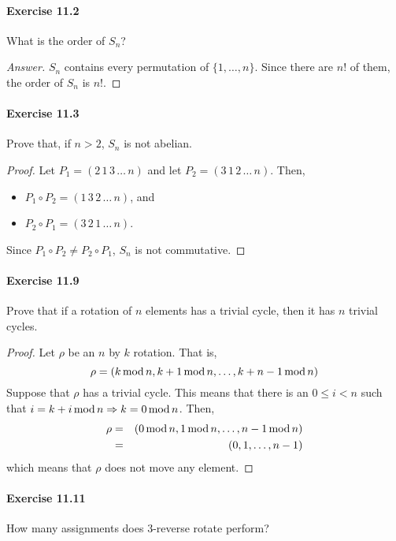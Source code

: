 \paragraph{Exercise 11.2}
What is the order of $S_n$?

\begin{proof}[Answer]
$S_n$ contains every permutation of $\{1,\dots,n\}$. Since there are $n!$ of
them, the order of $S_n$ is $n!$.
\end{proof}

\paragraph{Exercise 11.3}
Prove that, if $n > 2$, $S_n$ is not abelian.

\begin{proof}
Let $P_1 = (2 \, 1 \, 3 \, \dots \, n)$ and let
$P_2 = (3 \, 1 \, 2 \, \dots \, n)$. Then,
\begin{itemize}
    \item $P_1 \circ P_2 = (1 \, 3 \, 2 \, \dots \, n)$, and
    \item $P_2 \circ P_1 = (3 \, 2 \, 1 \, \dots \, n)$.
\end{itemize}
Since $P_1 \circ P_2 \neq P_2 \circ P_1$, $S_n$ is not commutative.
\end{proof}


\paragraph{Exercise 11.9}
Prove that if a rotation of $n$ elements has a trivial cycle, then it has $n$
trivial cycles.

\begin{proof}
Let $\rho$ be an $n$ by $k$ rotation. That is,
$$\rho = (k \, \mathrm{mod} \, n, k+1 \, \mathrm{mod} \, n, \dots, k+n-1 \, \mathrm{mod} \, n)$$
Suppose that $\rho$ has a trivial cycle. This means that there is an
$0 \leq i < n$ such that $i = k + i \, \mathrm{mod} \, n \Rightarrow 
k = 0 \, \mathrm{mod} \, n$. Then, 
\begin{eqnarray*}
    \rho &=& (0 \, \mathrm{mod} \, n, 1 \, \mathrm{mod} \, n, \dots, n-1 \, \mathrm{mod} \, n) \\
         &=& (0, 1, \dots, n-1)
\end{eqnarray*}
which means that $\rho$ does not move any element.
\end{proof}


\paragraph{Exercise 11.11}
How many assignments does 3-reverse rotate perform?

